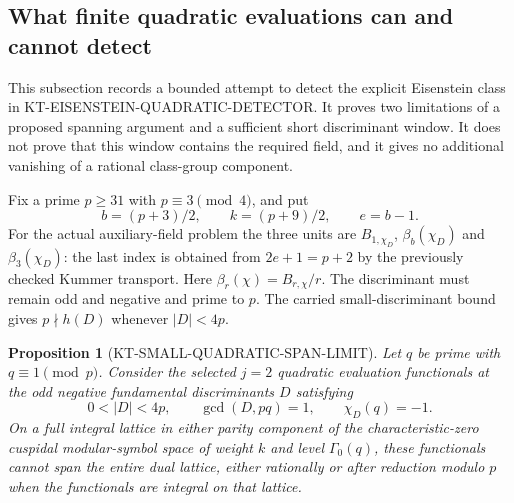 \documentclass[11pt,a4paper]{article}
\newtheorem{proposition}[theorem]{Proposition}
\theoremstyle{definition}
\begin{document}


\subsection{What finite quadratic evaluations can and cannot detect}

This subsection records a bounded attempt to detect the explicit
Eisenstein class in KT-EISENSTEIN-QUADRATIC-DETECTOR.  It proves two
limitations of a proposed spanning argument and a sufficient short
discriminant window.  It does not prove that this window contains the
required field, and it gives no additional vanishing of a rational
class-group component.

Fix a prime $p\geq31$ with $p\equiv3\pmod4$, and put
\[
 b=(p+3)/2,\qquad k=(p+9)/2,\qquad e=b-1.
\]
For the actual auxiliary-field problem the three units are
$B_{1,\chi_D}$, $\beta_b(\chi_D)$ and $\beta_3(\chi_D)$:
the last index is obtained from $2e+1=p+2$ by the previously
checked Kummer transport.  Here $\beta_r(\chi)=B_{r,\chi}/r$.
The discriminant must remain odd and negative and prime to $p$.
The carried small-discriminant bound gives $p\nmid h(D)$ whenever
$|D|<4p$.

\begin{proposition}[KT-SMALL-QUADRATIC-SPAN-LIMIT]
Let $q$ be prime with $q\equiv1\pmod p$.  Consider the selected
$j=2$ quadratic evaluation functionals at the odd negative fundamental
discriminants $D$ satisfying
\[
 0<|D|<4p,\qquad \gcd(D,pq)=1,\qquad \chi_D(q)=-1.
\]
On a full integral lattice in either parity component of the
characteristic-zero cuspidal modular-symbol space of weight $k$ and
level $\Gamma_0(q)$, these functionals cannot span the entire dual
lattice, either rationally or after reduction modulo $p$ when the
functionals are integral on that lattice.
\end{proposition}
\end{document}
